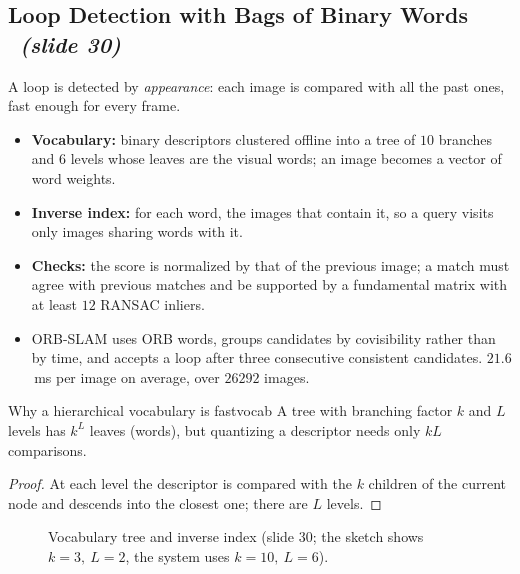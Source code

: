 \documentclass[11pt,a4paper]{article}
\newcommand{\slrs}[1]{\texorpdfstring{\ \emph{(slide #1)}}{ (slide #1)}}
\begin{document}
\subsection{Loop Detection with Bags of Binary Words \slrs{30}}
A loop is detected by \emph{appearance}: each image is compared with all the past ones, fast enough for every frame.
\begin{itemize}[nosep]
\item \textbf{Vocabulary:} binary descriptors clustered offline into a tree of $10$ branches and $6$ levels whose leaves are the visual words; an image becomes a vector of word weights.
\item \textbf{Inverse index:} for each word, the images that contain it, so a query visits only images sharing words with it.
\item \textbf{Checks:} the score is normalized by that of the previous image; a match must agree with previous matches and be supported by a fundamental matrix with at least $12$ RANSAC inliers.
\item ORB-SLAM uses ORB words, groups candidates by covisibility rather than by time, and accepts a loop after three consecutive consistent candidates. $21.6$\,ms per image on average, over $26292$ images.
\end{itemize}
\begin{proposition}{Why a hierarchical vocabulary is fast}{vocab}
A tree with branching factor $k$ and $L$ levels has $k^L$ leaves (words), but quantizing a descriptor needs only $kL$ comparisons.
\end{proposition}
\begin{proof}
At each level the descriptor is compared with the $k$ children of the current node and descends into the closest one; there are $L$ levels. \qedhere
\end{proof}
\begin{figure}[htbp]\centering
{}
\caption{Vocabulary tree and inverse index (slide 30; the sketch shows $k=3,\ L=2$, the system uses $k=10,\ L=6$).}
\end{figure}
\end{document}

